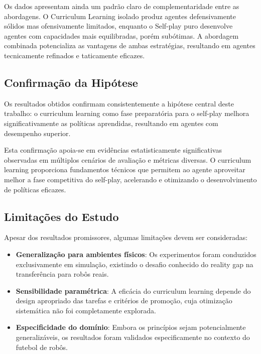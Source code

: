 Os dados apresentam ainda um padrão claro de complementaridade entre as abordagens. O Curriculum Learning isolado produz agentes defensivamente sólidos mas ofensivamente limitados, enquanto o Self-play puro desenvolve agentes com capacidades mais equilibradas, porém subótimas. A abordagem combinada potencializa as vantagens de ambas estratégias, resultando em agentes tecnicamente refinados e taticamente eficazes.

\subsection{Confirmação da Hipótese}

Os resultados obtidos confirmam consistentemente a hipótese central deste trabalho: o curriculum learning como fase preparatória para o self-play melhora significativamente as políticas aprendidas, resultando em agentes com desempenho superior.

Esta confirmação apoia-se em evidências estatisticamente significativas observadas em múltiplos cenários de avaliação e métricas diversas. O curriculum learning proporciona fundamentos técnicos que permitem ao agente aproveitar melhor a fase competitiva do self-play, acelerando e otimizando o desenvolvimento de políticas eficazes.

\subsection{Limitações do Estudo}

Apesar dos resultados promissores, algumas limitações devem ser consideradas:

\begin{itemize}
    \item \textbf{Generalização para ambientes físicos}: Os experimentos foram conduzidos exclusivamente em simulação, existindo o desafio conhecido do reality gap na transferência para robôs reais.
    
    \item \textbf{Sensibilidade paramétrica}: A eficácia do curriculum learning depende do design apropriado das tarefas e critérios de promoção, cuja otimização sistemática não foi completamente explorada.
    
    \item \textbf{Especificidade do domínio}: Embora os princípios sejam potencialmente generalizáveis, os resultados foram validados especificamente no contexto do futebol de robôs.
\end{itemize}

